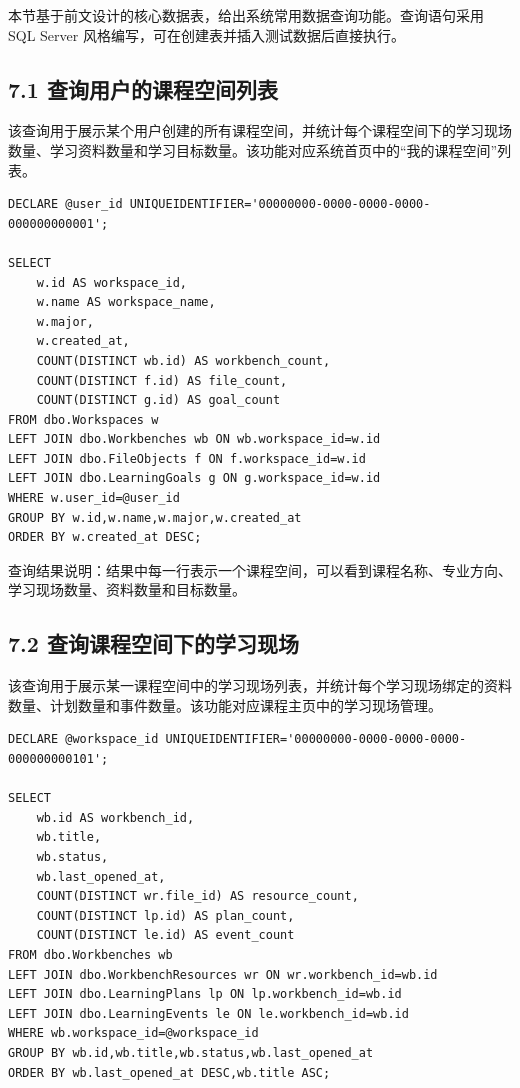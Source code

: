 \documentclass[10pt,a4paper,fontset=none]{ctexart}
\begin{document}
本节基于前文设计的核心数据表，给出系统常用数据查询功能。查询语句采用 SQL Server 风格编写，可在创建表并插入测试数据后直接执行。\par

\subsection*{7.1 查询用户的课程空间列表}

该查询用于展示某个用户创建的所有课程空间，并统计每个课程空间下的学习现场数量、学习资料数量和学习目标数量。该功能对应系统首页中的“我的课程空间”列表。\par

\begin{Verbatim}[fontsize=\scriptsize,frame=single]
DECLARE @user_id UNIQUEIDENTIFIER='00000000-0000-0000-0000-000000000001';

SELECT
    w.id AS workspace_id,
    w.name AS workspace_name,
    w.major,
    w.created_at,
    COUNT(DISTINCT wb.id) AS workbench_count,
    COUNT(DISTINCT f.id) AS file_count,
    COUNT(DISTINCT g.id) AS goal_count
FROM dbo.Workspaces w
LEFT JOIN dbo.Workbenches wb ON wb.workspace_id=w.id
LEFT JOIN dbo.FileObjects f ON f.workspace_id=w.id
LEFT JOIN dbo.LearningGoals g ON g.workspace_id=w.id
WHERE w.user_id=@user_id
GROUP BY w.id,w.name,w.major,w.created_at
ORDER BY w.created_at DESC;
\end{Verbatim}

查询结果说明：结果中每一行表示一个课程空间，可以看到课程名称、专业方向、学习现场数量、资料数量和目标数量。\par

\subsection*{7.2 查询课程空间下的学习现场}

该查询用于展示某一课程空间中的学习现场列表，并统计每个学习现场绑定的资料数量、计划数量和事件数量。该功能对应课程主页中的学习现场管理。\par

\begin{Verbatim}[fontsize=\scriptsize,frame=single]
DECLARE @workspace_id UNIQUEIDENTIFIER='00000000-0000-0000-0000-000000000101';

SELECT
    wb.id AS workbench_id,
    wb.title,
    wb.status,
    wb.last_opened_at,
    COUNT(DISTINCT wr.file_id) AS resource_count,
    COUNT(DISTINCT lp.id) AS plan_count,
    COUNT(DISTINCT le.id) AS event_count
FROM dbo.Workbenches wb
LEFT JOIN dbo.WorkbenchResources wr ON wr.workbench_id=wb.id
LEFT JOIN dbo.LearningPlans lp ON lp.workbench_id=wb.id
LEFT JOIN dbo.LearningEvents le ON le.workbench_id=wb.id
WHERE wb.workspace_id=@workspace_id
GROUP BY wb.id,wb.title,wb.status,wb.last_opened_at
ORDER BY wb.last_opened_at DESC,wb.title ASC;
\end{Verbatim}
\end{document}
